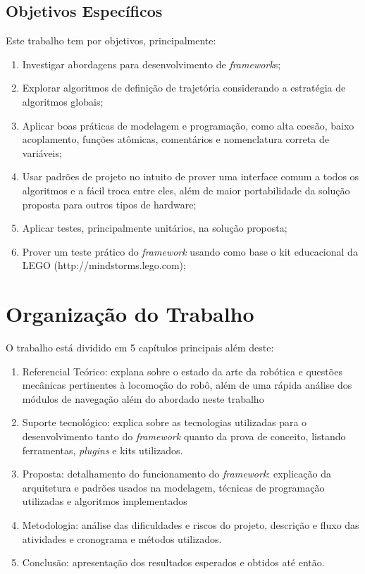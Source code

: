 \subsection{Objetivos Específicos}

Este trabalho tem por objetivos, principalmente:
\begin{enumerate}
	\item Investigar abordagens para desenvolvimento de \textit{framework}s;
	\item Explorar algoritmos de definição de trajetória considerando a estratégia de algoritmos globais;
	\item Aplicar boas práticas de modelagem e programação, como alta coesão, baixo acoplamento, funções atômicas, comentários e nomenclatura correta de variáveis;
	\item Usar padrões de projeto no intuito de prover uma interface comum a todos os algoritmos e a fácil troca entre eles, além de maior portabilidade da solução proposta para outros tipos de hardware;
	\item Aplicar testes, principalmente unitários, na solução proposta;
	\item Prover um teste prático do \textit{framework} usando como base o kit educacional da LEGO (http://mindstorms.lego.com);
\end{enumerate}

\section{Organização do Trabalho}

O trabalho está dividido em 5 capítulos principais além deste:
\begin{enumerate}
	\item Referencial Teórico: explana sobre o estado da arte da robótica e questões mecânicas pertinentes à locomoção do robô, além de uma rápida análise dos módulos de navegação além do abordado neste trabalho
	\item Suporte tecnológico: explica sobre as tecnologias utilizadas para o desenvolvimento tanto do \textit{framework} quanto da prova de conceito, listando ferramentas, \textit{plugins} e kits utilizados.	
	\item Proposta: detalhamento do funcionamento do \textit{framework}: explicação da arquitetura e padrões usados na modelagem, técnicas de programação utilizadas e algoritmos implementados
	\item Metodologia: análise das dificuldades e riscos do projeto, descrição e fluxo das atividades e cronograma e métodos utilizados.
	\item Conclusão: apresentação dos resultados esperados e obtidos até então.
\end{enumerate}
